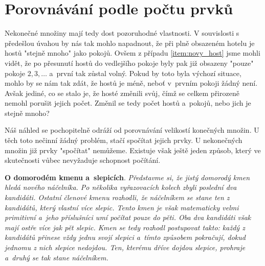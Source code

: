 \section{Porovnávání podle počtu prvků}\label{sec:porovnavani_podle_poctu_prvku}
Nekonečné množiny mají tedy dost pozoruhodné vlastnosti. V souvislosti s předešlou úvahou by nás tak mohlo napadnout, že při plně obsazeném hotelu je hostů "stejně mnoho" jako pokojů. Ovšem z případu \ref{item:novy_host} jsme mohli vidět, že po přesunutí hostů do vedlejšího pokoje byly pak již obsazeny "pouze" pokoje $2,3,\dots$ a~první tak zůstal volný. Pokud by toto byla výchozí situace, mohlo by se nám tak zdát, že hostů je méně, neboť v~prvním pokoji žádný není. Avšak jediné, co se stalo je, že hosté změnili svůj, čímž se celkem přirozeně nemohl porušit jejich počet. Změnil se tedy počet hostů a~pokojů, nebo jich je stejně mnoho?\par
Náš náhled se pochopitelně odráží od porovnávání velikostí konečných množin. U těch toto nečinní žádný problém, stačí spočítat jejich prvky. U nekonečných množin již prvky "spočítat" nemůžeme. Existuje však ještě jeden způsob, který ve skutečnosti vůbec nevyžaduje schopnost počítání.
\medskip

\noindent\textbf{O domorodém kmenu a~slepicích}. \textit{Představme si, že jistý domorodý kmen hledá nového náčelníka. Po několika vyřazovacích kolech zbyli poslední dva kandidáti. Ostatní členové kmenu rozhodli, že náčelníkem se stane ten z kandidátů, který vlastní více slepic. Tento kmen je však matematicky velmi primitivní a~jeho příslušníci umí počítat pouze do pěti. Oba dva kandidáti však mají ostře více jak pět slepic. Kmen se tedy rozhodl postupovat takto: každý z kandidátů přinese vždy jednu svojí slepici a~tímto způsobem pokračují, dokud jednomu z nich slepice nedojdou. Ten, kterému dříve dojdou slepice, prohraje a~druhý se tak stane náčelníkem.} \cite{Pick2019}
\medskip

